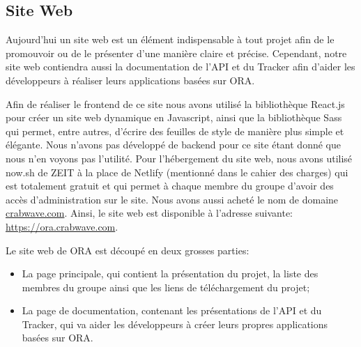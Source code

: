\documentclass[11pt, a4paper]{report}
\newcommand*{\surl}[1]{{\bodyfont\color{clearocean}\selectfont\url{#1}}}
\begin{document}
    \clearpage
          
    \subsection{Site Web}
      Aujourd'hui un site web est un élément indispensable à tout projet afin de le promouvoir ou de le présenter d'une manière claire et précise. Cependant, notre site web contiendra aussi la documentation de l'API et du Tracker afin d'aider les développeurs à réaliser leurs applications basées sur ORA.\newline

      Afin de réaliser le frontend de ce site nous avons utilisé la bibliothèque React.js pour créer un site web dynamique en Javascript, ainsi que la bibliothèque Sass qui permet, entre autres, d'écrire des feuilles de style de manière plus simple et élégante. Nous n'avons pas développé de backend pour ce site étant donné que nous n'en voyons pas l'utilité. Pour l'hébergement du site web, nous avons utilisé now.sh de ZEIT à la place de Netlify (mentionné dans le cahier des charges) qui est totalement gratuit et qui permet à chaque membre du groupe d'avoir des accès d'administration sur le site. Nous avons aussi acheté le nom de domaine \surl{crabwave.com}. Ainsi, le site web est disponible à l'adresse suivante: \surl{https://ora.crabwave.com}.\newline

      Le site web de ORA est découpé en deux grosses parties:
      \begin{itemize}
        \item La page principale, qui contient la présentation du projet, la liste des membres du groupe ainsi que les liens de téléchargement du projet;
        \item La page de documentation, contenant les présentations de l'API et du Tracker, qui va aider les développeurs à créer leurs propres applications basées sur ORA.
      \end{itemize}
      \bigbreak
    
\end{document}

